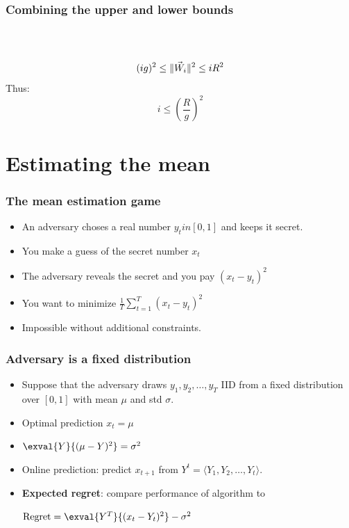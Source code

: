 \documentclass[handout]{beamer}
\begin{document}
\begin{frame}
\frametitle{Combining the upper and lower bounds}
~\\
~\\
\pause
$$(ig)^2 \leq \|\vec{W}_i\|^2 \leq i R^2$$
\pause
Thus:
$$ i \leq \left(\frac{R}{g} \right)^2 $$
\end{frame}

\section{Estimating the mean}

\begin{frame}
\frametitle{The mean estimation game}
\begin{itemize}
\item 
An adversary choses a real number $y_t in [0,1]$ and keeps it secret.
\item
You make a guess of the secret number $x_t$
\item
The adversary reveals the secret and you pay $(x_t-y_t)^2$ 
\end{itemize}
\begin{itemize}
\item You want to minimize $\frac{1}{T}\sum_{t=1}^T \left(x_t-y_t \right)^2$
\item Impossible without additional constraints.
\end{itemize}
\end{frame}

\begin{frame}
\frametitle{Adversary is a fixed distribution}
\begin{itemize}
\item 
Suppose that the adversary draws $y_1,y_2,\ldots,y_T$ IID from a fixed
distribution over $[0,1]$ with mean $\mu$ and std $\sigma$.
\item
Optimal prediction $x_t = \mu$ 
\item 
  $\exval{Y}{(\mu-Y)^2} = \sigma^2$
\item Online prediction: predict $x_{t+1}$ from $Y^t = \langle
  Y_1,Y_2,\ldots,Y_t \rangle$.
\item {\bf Expected regret}: compare performance of algorithm to
  
  $ \regret = \exval{Y^T}{(x_t-Y_t)^2} - \sigma^2$
\end{itemize}
\end{frame}
\end{document}
